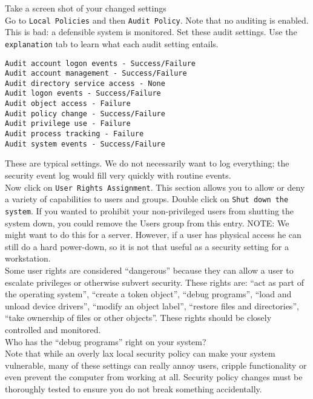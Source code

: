 \documentclass{article}
\begin{document}
\question Take a screen shot of your changed settings \\

Go to {\tt Local Policies} and then {\tt Audit Policy}. Note that no auditing is enabled. This is bad: a defensible system is monitored.  Set these audit settings. Use the {\tt explanation} tab to learn what each audit setting entails. 

\begin{verbatim}
Audit account logon events - Success/Failure
Audit account management - Success/Failure
Audit directory service access - None
Audit logon events - Success/Failure
Audit object access - Failure
Audit policy change - Success/Failure
Audit privilege use - Failure
Audit process tracking - Failure
Audit system events - Success/Failure
\end{verbatim}

These are typical settings. We do not necessarily want to log everything; the security event log would fill very quickly with routine events. \\

Now click on {\tt User Rights Assignment}. This section allows you to allow or deny a variety of capabilities to users and groups. Double click on {\tt Shut down the system}. If you wanted to prohibit your non-privileged users from shutting the system down, you could remove the Users group from this entry. NOTE: We might want to do this for a server. However, if a user has physical access he can still do a hard power-down, so it is not that useful as a security setting for a workstation.\\

Some user rights are considered ``dangerous'' because they can allow a user to escalate privileges or otherwise subvert security. These rights are: ``act as part of the operating system'', ``create a token object'', ``debug programs'', ``load and unload device drivers'', ``modify an object label'', ``restore files and directories'', ``take ownership of files or other objects''. These rights should be closely controlled and monitored. \\

\question Who has the ``debug programs'' right on your system? \\

Note that while an overly lax local security policy can make your system vulnerable, many of these settings can really annoy users, cripple functionality or even prevent the computer from working at all. Security policy changes must be thoroughly tested to ensure you do not break something accidentally.
\end{document}
